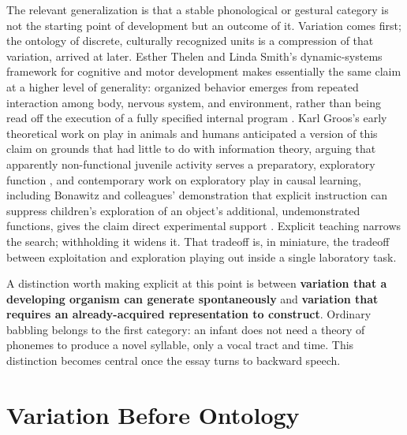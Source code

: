 \documentclass[11pt]{article}
\begin{document}
The relevant generalization is that a stable phonological or gestural category is not the starting point of development but an outcome of it. Variation comes first; the ontology of discrete, culturally recognized units is a compression of that variation, arrived at later. Esther Thelen and Linda Smith's dynamic-systems framework for cognitive and motor development makes essentially the same claim at a higher level of generality: organized behavior emerges from repeated interaction among body, nervous system, and environment, rather than being read off the execution of a fully specified internal program \citep{thelen1994}. Karl Groos's early theoretical work on play in animals and humans anticipated a version of this claim on grounds that had little to do with information theory, arguing that apparently non-functional juvenile activity serves a preparatory, exploratory function \citep{groos1898,groos1901}, and contemporary work on exploratory play in causal learning, including Bonawitz and colleagues' demonstration that explicit instruction can suppress children's exploration of an object's additional, undemonstrated functions, gives the claim direct experimental support \citep{bonawitz2011}. Explicit teaching narrows the search; withholding it widens it. That tradeoff is, in miniature, the tradeoff between exploitation and exploration playing out inside a single laboratory task.

A distinction worth making explicit at this point is between \textbf{variation that a developing organism can generate spontaneously} and \textbf{variation that requires an already-acquired representation to construct}. Ordinary babbling belongs to the first category: an infant does not need a theory of phonemes to produce a novel syllable, only a vocal tract and time. This distinction becomes central once the essay turns to backward speech.

\section{Variation Before Ontology}
\end{document}
